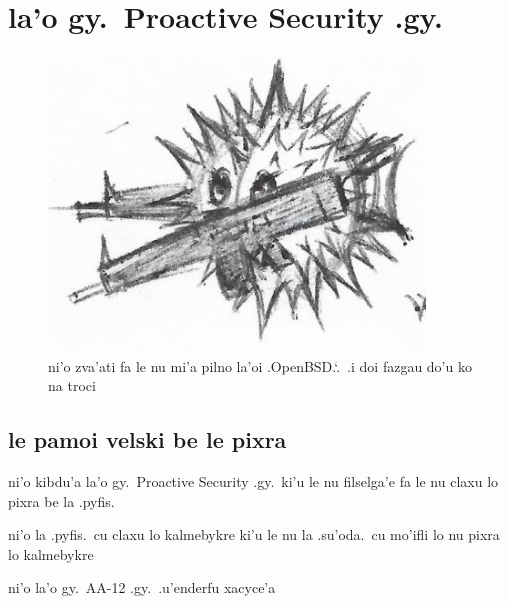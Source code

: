 \documentclass{report}
\newcommand\sds{\spacefactor\sfcode`.\ \space}
\begin{document}
\chapter{la'o gy.\ Proactive Security .gy.}
\begin{figure}[ht]
	\centering
	\includegraphics[width=10cm]{proactivesecurity/proactivesecurity.png}
	\caption[center]{ni'o zva'ati fa le nu mi'a pilno la'oi .OpenBSD.\sds  .i doi fazgau do'u ko na troci}
\end{figure}
\section{le pamoi velski be le pixra}
ni'o kibdu'a la'o gy.\ Proactive Security .gy.\ ki'u le nu filselga'e fa le nu claxu lo pixra be la .pyfis.

ni'o la .pyfis.\ cu claxu lo kalmebykre ki'u le nu la .su'oda.\ cu mo'ifli lo nu pixra lo kalmebykre

ni'o la'o gy.\ AA-12 .gy.\ .u'enderfu xacyce'a
\end{document}
